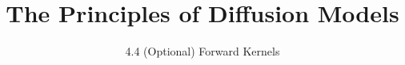 
\title{The Principles of Diffusion Models}
\subtitle{4.4 (Optional) Forward Kernels}


\begin{frame}
    \titlepage
\end{frame}


